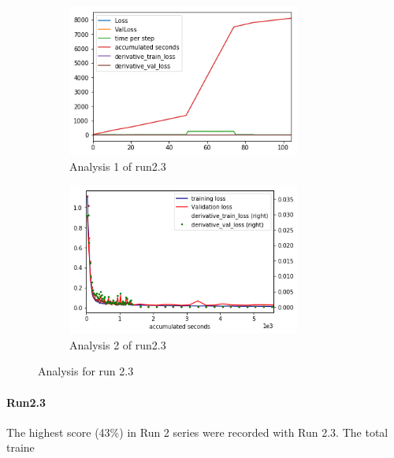 \documentclass[paper=a4, fontsize=11pt]{scrartcl} %
\numberwithin{equation}{section} %
\numberwithin{figure}{section} %
\numberwithin{table}{section} %
\begin{document}
\begin{figure}
   \begin{subfigure}{0.45\textwidth}
   \includegraphics[width=0.9\linewidth, height=5cm]{./imgs/analysis_0_2_3.png} 
   \caption{Analysis 1 of run2.3}
   \label{fig:subAnalysisRun23}
   \end{subfigure}
   \begin{subfigure}{0.45\textwidth}
   \includegraphics[width=0.9\linewidth, height=5cm]{./imgs/analysis_0_2_3plot.png}
   \caption{Analysis 2 of run2.3}
   \label{fig:subAnalysisRun23plot}
   \end{subfigure}
	
   \caption{Analysis for run 2.3}
   \label{fig:AnalysisRun23}
\end{figure}
\paragraph{Run2.3}\label{rubric70}
The highest score (43\%) in Run 2 series were recorded with Run 2.3. The total traine
\end{document}
